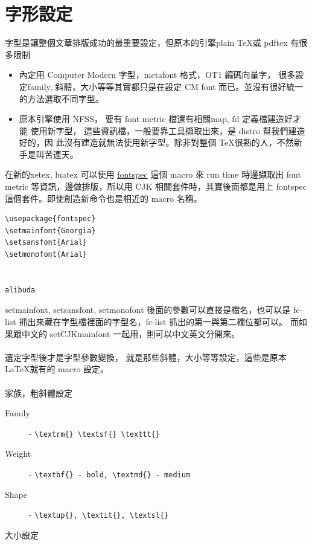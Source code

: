 \section{字形設定}
字型是讓整個文章排版成功的最重要設定，但原本的引擎plain \TeX 或 pdftex 
有很多限制
\begin{itemize}
\item 內定用 Computer Modern 字型，metafont 格式，OT1 編碼向量字，
很多設定family, 斜體，大小等等其實都只是在設定 CM font 而已。並沒有很好統一
的方法選取不同字型。
\item 原本引擎使用 NFSS， 要有 font metric 檔還有相關map, fd 定義檔建造好才能
使用新字型， 這些資訊檔，一般要靠工具擷取出來，是 distro 幫我們建造好的，因
此沒有建造就無法使用新字型。除非對整個 \TeX 很熟的人，不然新手是叫苦連天。
\end{itemize}
在新的xetex, luatex 可以使用 \href{https://texdoc.org/index.html}{fontspec}
這個 macro 來 run time 時邊擷取出
font metric 等資訊，邊做排版，所以用 CJK 相關套件時，其實後面都是用上 fontspec
這個套件。即使創造新命令也是相近的 macro 名稱。
\begin{verbatim}
\usepackage{fontspec}
\setmainfont{Georgia}
\setsansfont{Arial}
\setmonofont{Arial}


alibuda
\end{verbatim}
setmainfont, setsansfont, setmonofont 後面的參數可以直接是檔名，也可以是
fc-list 抓出來藏在字型檔裡面的字型名，fc-list 抓出的第一與第二欄位都可以。
而如果跟中文的 setCJKmainfont 一起用，則可以中文英文分開來。
\\\\
選定字型後才是字型參數變換，
就是那些斜體，大小等等設定，這些是原本 \LaTeX 就有的 macro 設定。
\\\\

家族，粗斜體設定

\begin{description}
  \item [Family] - \verb=\textrm{} \textsf{} \texttt{}=
  \item [Weight] - \verb=\textbf{} - bold, \textmd{} - medium=
  \item [Shape] - \verb=\textup{}, \textit{}, \textsl{}=
\end{description}

大小設定

